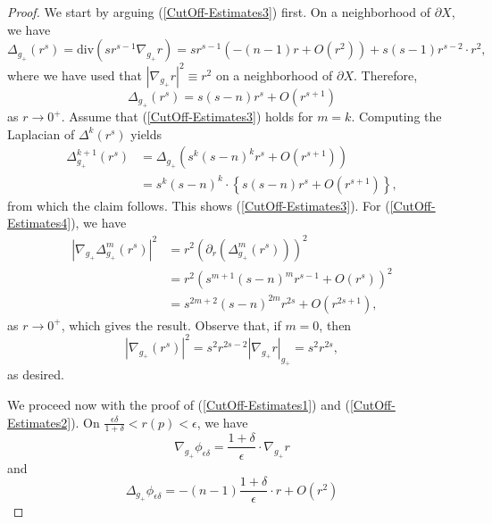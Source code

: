 \documentclass{amsart}
\newcommand{\Div}{\text{div}}
\newcommand{\D}{\delta}
\newcommand{\E}{\epsilon}
\begin{document}
\begin{proof}
    We start by arguing (\ref{CutOff-Estimates3}) first. On a neighborhood of $\partial X$, we have
    \[
    \Delta_{g_+}(r^s) = \Div(sr^{s-1}\nabla_{g_+}r) = sr^{s-1}(-(n-1)r+O(r^2)) + s(s-1)r^{s-2}\cdot r^2,
    \]
    where we have used that $|\nabla_{g_+}r|^2\equiv r^2$ on a neighborhood of $\partial X$. Therefore, 
    \begin{equation}\label{CutOff-Estimates5}
        \Delta_{g_+}(r^s) = s(s-n)r^s + O(r^{s+1})
    \end{equation}
    as $r\to 0^+$. Assume that (\ref{CutOff-Estimates3}) holds for $m=k$. Computing the Laplacian of $\Delta^k(r^s)$ yields 
    \[
    \begin{split}
    \Delta_{g_+}^{k+1}(r^s) &= \Delta_{g_+}(s^k(s-n)^kr^s + O(r^{s+1}))\\ &= s^k(s-n)^k\cdot\left\{s(s-n)r^s + O(r^{s+1})\right\},
    \end{split}
    \]
    from which the claim follows. This shows
    (\ref{CutOff-Estimates3}). For (\ref{CutOff-Estimates4}), we have
    \[
    \begin{split}
    |\nabla_{g_+}\Delta_{g_+}^m(r^s)|^2 &= r^2(\partial_r(\Delta^m_{g_+}(r^s)))^2 \\&= r^2(s^{m+1}(s-n)^mr^{s-1} + O(r^{s}))^2 \\& = s^{2m+2}(s-n)^{2m}r^{2s} + O(r^{2s+1}),
    \end{split}
    \]
    as $r\to0^+$, which gives the result. Observe that, if $m=0$, then 
    \[
    |\nabla_{g_+}(r^s)|^2 = s^2r^{2s-2}|\nabla_{g_+}r|_{g_+} = s^2r^{2s},
    \]
    as desired. 
    
    
    We proceed now with the proof of (\ref{CutOff-Estimates1}) and (\ref{CutOff-Estimates2}). On $\frac{\epsilon \D}{1+\D}< r(p)< \epsilon$, we have
    \begin{equation}
        \nabla_{g_+}\phi_{\E\D} = \frac{1+\D}{\E}\cdot \nabla_{g_+}r
    \end{equation}
    and 
    \begin{equation}
        \Delta_{g_+}\phi_{\E\D} = -(n-1)\frac{1+\D}{\E}\cdot r + O(r^2)
    \end{equation}


\end{proof}
\end{document}
